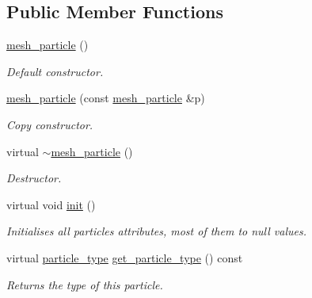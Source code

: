 \subsection*{Public Member Functions}
\begin{DoxyCompactItemize}
\item 
\mbox{\label{classphysim_1_1particles_1_1mesh__particle_a0d7ccc38aee9b4cdeb5f66712d281040}} 
\hyperlink{classphysim_1_1particles_1_1mesh__particle_a0d7ccc38aee9b4cdeb5f66712d281040}{mesh\+\_\+particle} ()
\begin{DoxyCompactList}\small\item\em Default constructor. \end{DoxyCompactList}\item 
\mbox{\label{classphysim_1_1particles_1_1mesh__particle_a157eed705543d26a39ca4de632845699}} 
\hyperlink{classphysim_1_1particles_1_1mesh__particle_a157eed705543d26a39ca4de632845699}{mesh\+\_\+particle} (const \hyperlink{classphysim_1_1particles_1_1mesh__particle}{mesh\+\_\+particle} \&p)
\begin{DoxyCompactList}\small\item\em Copy constructor. \end{DoxyCompactList}\item 
\mbox{\label{classphysim_1_1particles_1_1mesh__particle_acb853a925c65cd562252392ec754d614}} 
virtual \hyperlink{classphysim_1_1particles_1_1mesh__particle_acb853a925c65cd562252392ec754d614}{$\sim$mesh\+\_\+particle} ()
\begin{DoxyCompactList}\small\item\em Destructor. \end{DoxyCompactList}\item 
virtual void \hyperlink{classphysim_1_1particles_1_1mesh__particle_a1b3c3eac1e62296c2facd8c9d9b84608}{init} ()
\begin{DoxyCompactList}\small\item\em Initialises all particle\textquotesingle{}s attributes, most of them to null values. \end{DoxyCompactList}\item 
\mbox{\label{classphysim_1_1particles_1_1mesh__particle_afb35d487caf79656b4e433ad34b0d8ac}} 
virtual \hyperlink{namespacephysim_1_1particles_a068e6cda6626fbd381c07a9835425b08}{particle\+\_\+type} \hyperlink{classphysim_1_1particles_1_1mesh__particle_afb35d487caf79656b4e433ad34b0d8ac}{get\+\_\+particle\+\_\+type} () const
\begin{DoxyCompactList}\small\item\em Returns the type of this particle. \end{DoxyCompactList}\end{DoxyCompactItemize}
